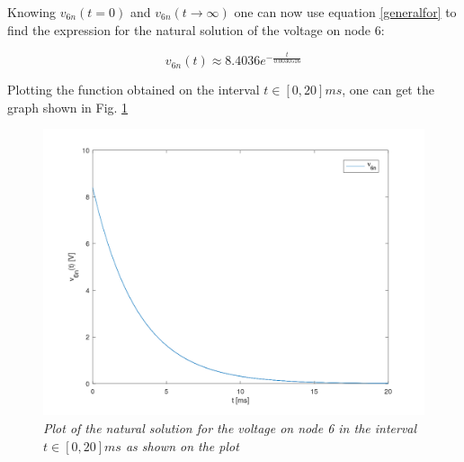Knowing $v_{6n}(t = 0)$ and $v_{6n}(t\to\infty)$ one can now use equation \eqref{generalfor} to find the expression for the natural solution of the voltage on node 6:

\begin{equation}
    v_{6n}(t) \approx 8.4036e^{-\frac{t}{0.0030516}}
\end{equation}

Plotting the function obtained on the interval $t \in [0,20]ms$, one can get the graph shown in Fig. \ref{fig:natural}

\begin{figure}[H]
    \centering
    \includegraphics[width = 0.85\linewidth]{../mat/v6n.png}
        \caption{\textit{Plot of the natural solution for the voltage on node 6 in the interval $t\in[0,20]ms$ as shown on the plot}}
    \label{fig:natural}
\end{figure}